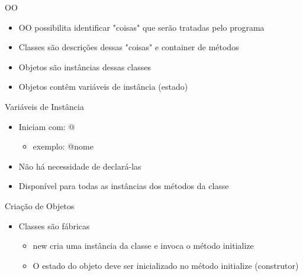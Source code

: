 
\begin{frame}[fragile,t]{OO}
  \begin{itemize}
    \item OO possibilita identificar "coisas" que serão tratadas pelo programa
    \item \alert{Classes} são descrições dessas \alert{"coisas"} e container de métodos
    \item Objetos são \alert{instâncias} dessas classes
    \item Objetos contêm \alert{variáveis de instância} (estado)
  \end{itemize}
\end{frame}

\begin{frame}[fragile,t]{Variáveis de Instância}  
 \begin{itemize}
    \item Iniciam com: \alert{@}
    \begin{itemize}
      \item exemplo: @nome
    \end{itemize}
    \item Não há necessidade de declará-las 
    \item Disponível para todas as instâncias dos métodos da classe
  \end{itemize}
\end{frame}

\begin{frame}{Criação de Objetos}    
  \begin{itemize}
    \item Classes são fábricas
    \begin{itemize}
      \item \alert{new} cria uma instância da classe e invoca o método \alert{initialize}
      \item O estado do objeto deve ser inicializado no método \alert{initialize} (construtor)
    \end{itemize}
  \end{itemize}  
  
  
\end{frame}


